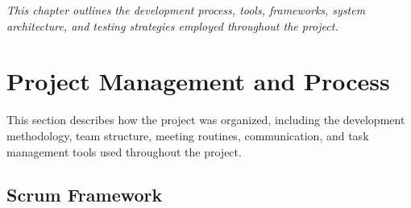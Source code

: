 %

\textit{This chapter outlines the development process, tools, frameworks, system architecture, and testing strategies employed throughout the project.}

\section{Project Management and Process}



This section describes how the project was organized, including the development methodology, team structure, meeting routines, communication, and task management tools used throughout the project.

\subsection{Scrum Framework}
\label{sec:dev_methodology}

